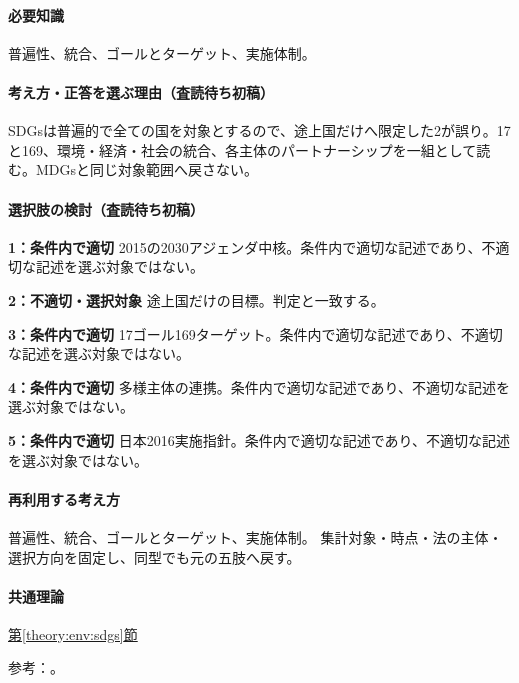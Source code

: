 \paragraph{必要知識} 普遍性、統合、ゴールとターゲット、実施体制。

\paragraph{考え方・正答を選ぶ理由（査読待ち初稿）} SDGsは普遍的で全ての国を対象とするので、途上国だけへ限定した2が誤り。17と169、環境・経済・社会の統合、各主体のパートナーシップを一組として読む。MDGsと同じ対象範囲へ戻さない。

\paragraph{選択肢の検討（査読待ち初稿）}\mbox{}\par

\noindent\textbf{1：条件内で適切} 2015の2030アジェンダ中核。条件内で適切な記述であり、不適切な記述を選ぶ対象ではない。\par

\noindent\textbf{2：不適切・選択対象} 途上国だけの目標。判定と一致する。\par

\noindent\textbf{3：条件内で適切} 17ゴール169ターゲット。条件内で適切な記述であり、不適切な記述を選ぶ対象ではない。\par

\noindent\textbf{4：条件内で適切} 多様主体の連携。条件内で適切な記述であり、不適切な記述を選ぶ対象ではない。\par

\noindent\textbf{5：条件内で適切} 日本2016実施指針。条件内で適切な記述であり、不適切な記述を選ぶ対象ではない。\par

\paragraph{再利用する考え方} 普遍性、統合、ゴールとターゲット、実施体制。 集計対象・時点・法の主体・選択方向を固定し、同型でも元の五肢へ戻す。

\paragraph{共通理論} \hyperref[theory:env:sdgs]{第\ref*{theory:env:sdgs}節}

\par 参考：\cite{env_sdgs_un,env_sdgs2016}。

